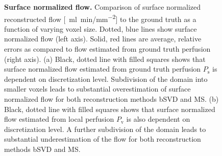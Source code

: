\documentclass[10pt]{article}
\begin{document}
\begin{figure}[!h]
\caption{{\bf Surface normalized flow.}
Comparison of surface normalized reconstructed flow [\SI{}{\milli\litre\per\minute/\milli\meter\squared}] to the ground truth as a function of varying voxel size. Dotted, blue lines show surface normalized flow (left axis). Solid, red lines are average, relative errors as compared to flow estimated from ground truth perfusion (right axis). (a) Black, dotted line with filled squares shows that surface normalized flow estimated from ground truth perfusion $P_{\mathrm{s}}$ is dependent on discretization level. Subdivision of the domain into smaller voxels leads to substantial overestimation of surface normalized flow for both reconstruction methods bSVD and MS. (b) Black, dotted line with filled squares shows that surface normalized flow estimated from local perfusion $P_{\mathrm{v}}$ is also dependent on discretization level. A further subdivision of the domain leads to substantial underestimation of the flow for both reconstruction methods bSVD and MS.}
\label{fig:surfnormperf}
\end{figure}



\end{document}
